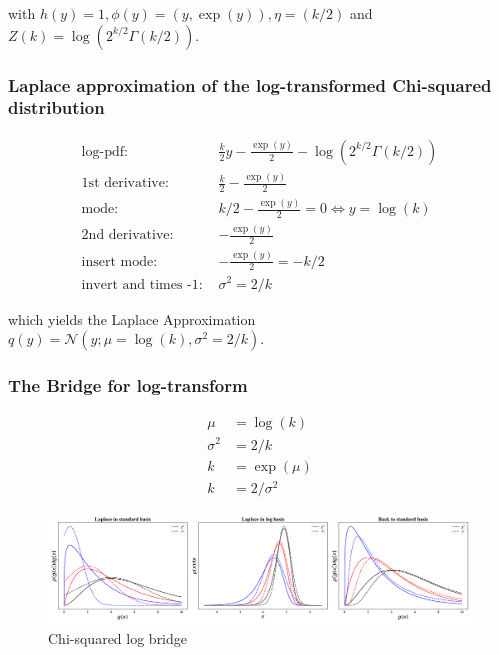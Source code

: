 with $h(y) = 1, \phi(y) =(y, \exp(y)), \eta=(k/2)$ and $Z(k) =  \log(2^{k/2}\Gamma(k/2))$. 

\subsubsection{Laplace approximation of the log-transformed Chi-squared distribution}

\begin{align*}
\text{log-pdf: } &\frac{k}{2}y - \frac{\exp(y)}{2} - \log(2^{k/2}\Gamma(k/2)) \\
\text{1st derivative: }&  \frac{k}{2} - \frac{\exp(y)}{2} \\
\text{mode: }& k/2 - \frac{\exp(y)}{2} = 0 \Leftrightarrow y = \log(k)\\
\text{2nd derivative: }&  -\frac{\exp(y)}{2}\\
\text{insert mode: }& -\frac{\exp(y)}{2} = -k/2\\
\text{invert and times -1: }&\sigma^2 = 2/k
\end{align*}

which yields the Laplace Approximation $q(y) = \mathcal{N}(y; \mu= \log(k), \sigma^2 = 2/k)$.

\subsubsection{The Bridge for log-transform}

\begin{subequations}
\begin{align}
	\mu &= \log(k) \\
	\sigma^2 &= 2/k \\
	k &= \exp(\mu) \\
	k &= 2/\sigma^2
\end{align}
\end{subequations}

\begin{figure}[!htb]
	\centering
	\includegraphics[width=\textwidth]{figures/chi2_log_bridge.pdf}
	\caption{Chi-squared log bridge}
	\label{fig:chi2_log_bridge}
\end{figure}

